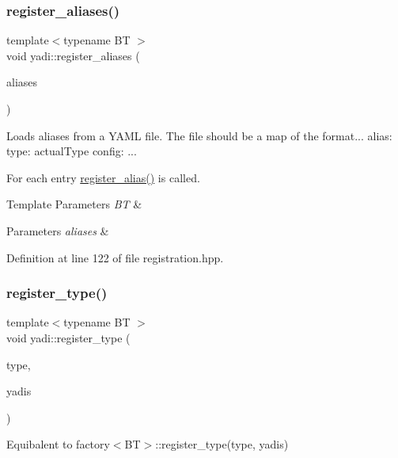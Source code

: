 \subsubsection{\texorpdfstring{register\+\_\+aliases()}{register\_aliases()}}
{\footnotesize\ttfamily template$<$typename BT $>$ \\
void yadi\+::register\+\_\+aliases (\begin{DoxyParamCaption}\item[{Y\+A\+M\+L\+::\+Node}]{aliases }\end{DoxyParamCaption})}



Loads aliases from a Y\+A\+ML file. The file should be a map of the format... alias\+: type\+: actual\+Type config\+: ... 

For each entry \hyperlink{namespaceyadi_a5f8e048a8bef5792a7c5b3aae435999d}{register\+\_\+alias()} is called. 
\begin{DoxyTemplParams}{Template Parameters}
{\em BT} & \\
\hline
\end{DoxyTemplParams}

\begin{DoxyParams}{Parameters}
{\em aliases} & \\
\hline
\end{DoxyParams}


Definition at line 122 of file registration.\+hpp.

\mbox{\label{namespaceyadi_a848729993f692098bf175774503b80ee}} 
\subsubsection{\texorpdfstring{register\+\_\+type()}{register\_type()}\hspace{0.1cm}{\footnotesize\ttfamily [1/3]}}
{\footnotesize\ttfamily template$<$typename BT $>$ \\
void yadi\+::register\+\_\+type (\begin{DoxyParamCaption}\item[{std\+::string}]{type,  }\item[{yadi\+\_\+info\+\_\+t$<$ BT $>$}]{yadis }\end{DoxyParamCaption})}



Equibalent to factory$<$\+B\+T$>$\+::register\+\_\+type(type, yadis) 


